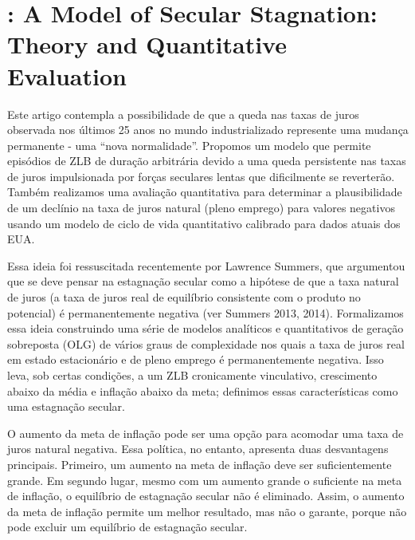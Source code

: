 \section{\citet{Eggertsson:2019}: A Model of Secular Stagnation: Theory and Quantitative Evaluation}
Este artigo contempla a possibilidade de que a queda nas taxas de juros observada nos últimos 25 anos no mundo industrializado represente uma mudança permanente - uma “nova normalidade”. Propomos um modelo que permite episódios de ZLB de duração arbitrária devido a uma queda persistente nas taxas de juros impulsionada por forças seculares lentas que dificilmente se reverterão. Também realizamos uma avaliação quantitativa para determinar a plausibilidade de um declínio na taxa de juros natural (pleno emprego) para valores negativos usando um modelo de ciclo de vida quantitativo calibrado para dados atuais dos EUA.

Essa ideia foi ressuscitada recentemente por Lawrence Summers, que argumentou que se deve pensar na estagnação secular como a hipótese de que a taxa natural de juros (a taxa de juros real de equilíbrio consistente com o produto no potencial) é permanentemente negativa (ver Summers 2013, 2014). Formalizamos essa ideia construindo uma série de modelos analíticos e quantitativos de geração sobreposta (OLG) de vários graus de complexidade nos quais a taxa de juros real em estado estacionário e de pleno emprego é permanentemente negativa. Isso leva, sob certas condições, a um ZLB cronicamente vinculativo, crescimento abaixo da média e inflação abaixo da meta; definimos essas características como uma estagnação secular.

O aumento da meta de inflação pode ser uma opção para acomodar uma taxa de juros natural negativa. Essa política, no entanto, apresenta duas desvantagens principais. Primeiro, um aumento na meta de inflação deve ser suficientemente grande. Em segundo lugar, mesmo com um aumento grande o suficiente na meta de inflação, o equilíbrio de estagnação secular não é eliminado.
Assim, o aumento da meta de inflação permite um melhor resultado, mas não o garante, porque não pode excluir um equilíbrio de estagnação secular.

